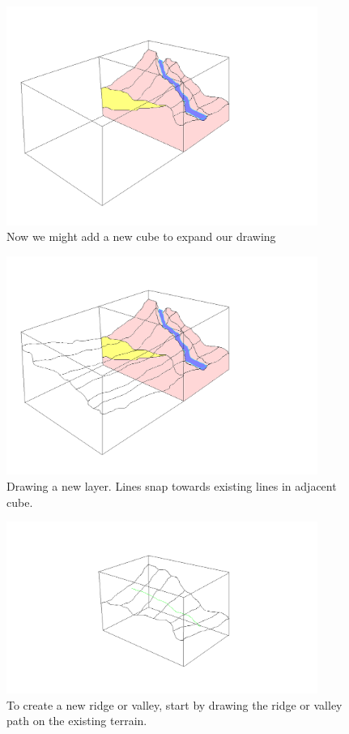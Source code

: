 \documentclass[12pt,a4paper]{article}
\begin{document}
\begin{figure}
\centering
\includegraphics[width=4in]{newCube}
\caption[]{
  \footnotesize
  Now we might add a new cube to expand our drawing
  \label{fig:newCube}
}
\end{figure}

\begin{figure}
\centering
\includegraphics[width=4in]{newCubeLayer}
\caption[]{
  \footnotesize
  Drawing a new layer. Lines snap towards existing lines in adjacent cube.
  \label{fig:newCubeLayer}
}
\end{figure}

\begin{figure}
\centering
\includegraphics[width=4in]{createRidge0}
\caption[]{
  \footnotesize
  To create a new ridge or valley, start by drawing the ridge or valley path on the existing terrain. 
  \label{fig:createRidge0}
}
\end{figure}
\end{document}

